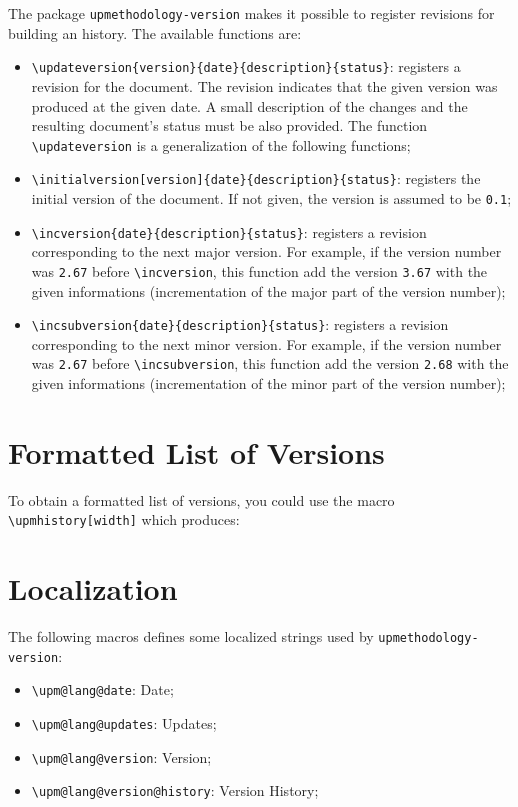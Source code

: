 \documentclass[book]{upmethodology-document}
\begin{document}
The package \texttt{upmethodology-version} makes it possible to register revisions for building an history. The available functions are:
\begin{itemize}
\item \texttt{{\textbackslash}updateversion\{version\}\{date\}\{description\}\{status\}}: registers a revision for the document. The revision indicates that the given version was produced at the given date. A small description of the changes and the resulting document's status must be also provided. The function \texttt{{\textbackslash}updateversion} is a generalization of the following functions;

\item \texttt{{\textbackslash}initialversion[version]\{date\}\{description\}\{status\}}: registers the initial version of the document. If not given, the version is assumed to be \texttt{0.1};

\item \texttt{{\textbackslash}incversion\{date\}\{description\}\{status\}}: registers a revision corresponding to the next major version. For example, if the version number was \texttt{2.67} before \texttt{{\textbackslash}incversion}, this function add the version \texttt{3.67} with the given informations (incrementation of the major part of the version number);

\item \texttt{{\textbackslash}incsubversion\{date\}\{description\}\{status\}}: registers a revision corresponding to the next minor version. For example, if the version number was \texttt{2.67} before \texttt{{\textbackslash}incsubversion}, this function add the version \texttt{2.68} with the given informations (incrementation of the minor part of the version number);
\end{itemize}

\section{Formatted List of Versions}

To obtain a formatted list of versions, you could use the macro \texttt{{\textbackslash}upmhistory[width]} which produces:

\upmhistory

\section{Localization}

The following macros defines some localized strings used by \texttt{upmethodology-version}:
\begin{itemize}
\item \texttt{{\textbackslash}upm@lang@date}: Date;
\item \texttt{{\textbackslash}upm@lang@updates}: Updates;
\item \texttt{{\textbackslash}upm@lang@version}: Version;
\item \texttt{{\textbackslash}upm@lang@version@history}: Version History;
\end{itemize}
\end{document}
